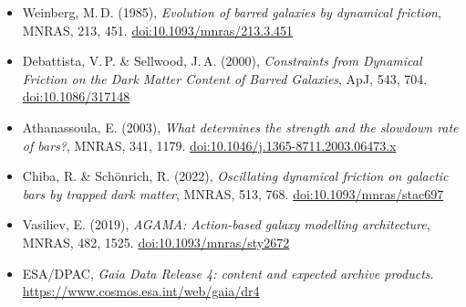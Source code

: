 \documentclass[11pt,a4paper]{article}
\begin{document}
{\begin{itemize}[leftmargin=1.2em,itemsep=0.1em,parsep=0pt,topsep=0.3em]
\item Weinberg, M.\,D. (1985), \emph{Evolution of barred galaxies by dynamical friction}, MNRAS, 213, 451. \href{https://doi.org/10.1093/mnras/213.3.451}{doi:10.1093/mnras/213.3.451}
\item Debattista, V.\,P. \& Sellwood, J.\,A. (2000), \emph{Constraints from Dynamical Friction on the Dark Matter Content of Barred Galaxies}, ApJ, 543, 704. \href{https://doi.org/10.1086/317148}{doi:10.1086/317148}
\item Athanassoula, E. (2003), \emph{What determines the strength and the slowdown rate of bars?}, MNRAS, 341, 1179. \href{https://doi.org/10.1046/j.1365-8711.2003.06473.x}{doi:10.1046/j.1365-8711.2003.06473.x}
\item Chiba, R. \& Schönrich, R. (2022), \emph{Oscillating dynamical friction on galactic bars by trapped dark matter}, MNRAS, 513, 768. \href{https://doi.org/10.1093/mnras/stac697}{doi:10.1093/mnras/stac697}
\item Vasiliev, E. (2019), \emph{AGAMA: Action-based galaxy modelling architecture}, MNRAS, 482, 1525. \href{https://doi.org/10.1093/mnras/sty2672}{doi:10.1093/mnras/sty2672}
\item ESA/DPAC, \emph{Gaia Data Release 4: content and expected archive products}. \url{https://www.cosmos.esa.int/web/gaia/dr4}
\end{itemize}
}
\end{document}
